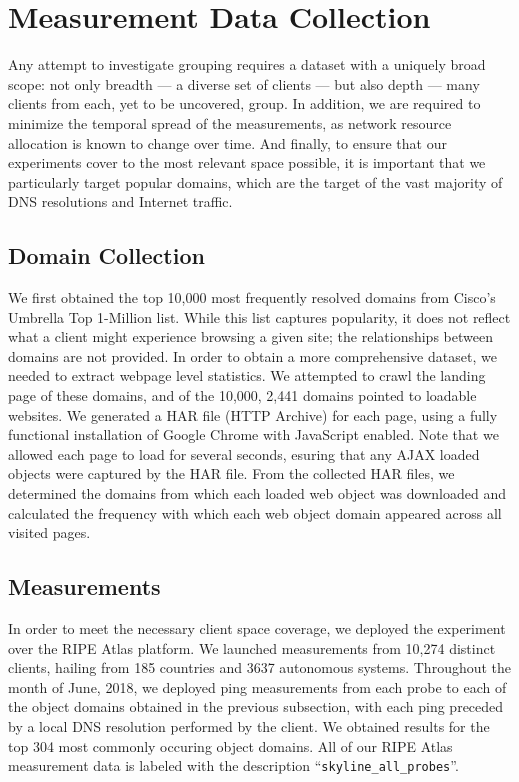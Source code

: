 \section{Measurement Data Collection} \label{sky:data}

Any attempt to investigate grouping requires a dataset with a
uniquely broad scope: not only breadth --- a diverse set of clients --- but also depth --- many
clients from each, yet to be uncovered, group. In addition, we are required to minimize the
temporal spread of the measurements, as network resource allocation is known to change over time.
And finally, to ensure that our experiments cover to the most relevant space possible, it is
important that we particularly target popular domains, which are the target of the vast majority
of DNS resolutions and Internet traffic.

\subsection{Domain Collection}

We first obtained the top 10,000 most frequently resolved domains from Cisco's Umbrella Top
1-Million list. While this list captures popularity, it does not reflect what a client might
experience browsing a given site; the relationships between domains are not provided. In order to
obtain a more comprehensive dataset, we needed to extract webpage level statistics. We attempted to
crawl the landing page of these domains, and of the 10,000, 2,441 domains pointed to loadable
websites. We generated a HAR file (HTTP Archive) for each page, using a fully functional
installation of Google Chrome with JavaScript enabled. Note that we allowed each page to load for
several seconds, esuring that any AJAX loaded objects were captured by the HAR file. From the
collected HAR files, we determined the domains from which each loaded web object was downloaded and
calculated the frequency with which each web object domain appeared across all visited pages. 

\subsection{Measurements}

In order to meet the necessary client space coverage, we deployed the experiment
over the RIPE Atlas platform. We launched measurements from 10,274 distinct
clients, hailing from 185 countries and 3637 autonomous systems. Throughout the
month of June, 2018, we deployed ping measurements from each probe to each of
the object domains obtained in the previous subsection, with each ping preceded
by a local DNS resolution performed by the client. We obtained results for the
top 304 most commonly occuring object domains. All of our RIPE Atlas measurement
data is labeled with the description ``\verb|skyline_all_probes|''. 

